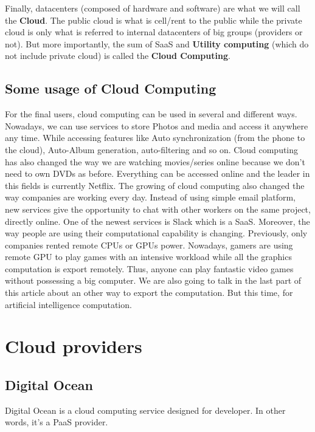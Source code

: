 Finally, datacenters (composed of hardware and software) are what we will call the \textbf{Cloud}. The public cloud is what is cell/rent to the public while the private cloud is only what is referred to internal datacenters of big groups (providers or not). But more importantly, the sum of SaaS and \textbf{Utility computing} (which do not include private cloud) is called the \textbf{Cloud Computing}.

\subsection{Some usage of Cloud Computing}

For the final users, cloud computing can be used in several and different ways. Nowadays, we can use services to store Photos and media and access it anywhere any time. While accessing features like Auto synchronization (from the phone to the cloud), Auto-Album generation, auto-filtering and so on. Cloud computing has also changed the way we are watching movies/series online because we don't need to own DVDs as before. Everything can be accessed online and the leader in this fields is currently Netflix. The growing of cloud computing also changed the way companies are working every day. Instead of using simple email platform, new services give the opportunity to chat with other workers on the same project, directly online. One of the newest services is Slack which is a SaaS. Moreover, the way people are using their computational capability is changing. Previously, only companies rented remote CPUs or GPUs power. Nowadays, gamers are using remote GPU to play games with an intensive workload while all the graphics computation is export remotely. Thus, anyone can play fantastic video games without possessing a big computer. We are also going to talk in the last part of this article about an other way to export the computation. But this time, for artificial intelligence computation.

\section{Cloud providers}

\subsection{Digital Ocean}

Digital Ocean is a cloud computing service designed for developer. In other words, it’s a PaaS provider.

